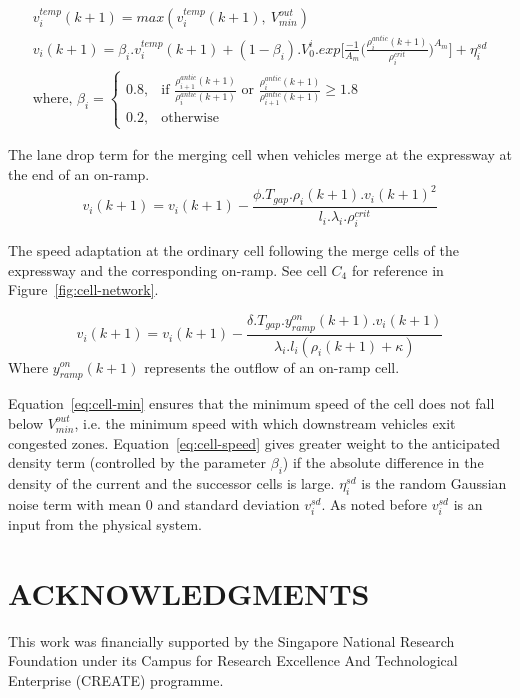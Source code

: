 \documentclass[12pt]{article}
\begin{document}
\begin{subequations}

\begin{eqnarray}
\label{eq:cell-min}
v_i^{temp}(k+1)=max(v_i^{temp}(k+1),~V^{out}_{min})\\
\label{eq:cell-speed}
v_i(k+1)=\beta_i.v_i^{temp}(k+1)+(1-\beta_i).V_0^i.exp\bigg[\frac{-1}{A_m}\bigg( \frac{\rho_i^{antic}(k+1)}{\rho_i^{crit}}\bigg)^{A_m} \bigg]+\eta_i^{sd}\\
\text{where, }\beta_i=
\begin{cases}
0.8, & \text{if } \frac{\rho_{i+1}^{antic}(k+1)}{\rho_i^{antic}(k+1)} \text{ or } \frac{\rho_{i}^{antic}(k+1)}{\rho_{i+1}^{antic}(k+1)} \ge 1.8\\
0.2, & \text{otherwise}
\end{cases}
\end{eqnarray}
\end{subequations}

The lane drop term for the merging cell when vehicles merge at the expressway at the end of an on-ramp.
\begin{equation}
\label{eq:lane-drop-term}
v_i(k+1)=v_i(k+1)-\frac{\phi.T_{gap}.\rho_i(k+1).v_i(k+1)^2}{l_i.\lambda_i.\rho_i^{crit}}
\end{equation} 

The speed adaptation at the ordinary cell following the merge cells of the expressway and the corresponding on-ramp. See cell $C_4$ for reference in Figure~\ref{fig:cell-network}.

\begin{equation}
\label{eq:ramp-merge-term}
v_i(k+1)=v_i(k+1)-\frac{\delta.T_{gap}.y^{on}_{ramp}(k+1).v_i(k+1)}{\lambda_i.l_i(\rho_i(k+1)+\kappa)}
\end{equation}
Where $y^{on}_{ramp}(k+1)$ represents the outflow of an on-ramp cell.

 
Equation~\ref{eq:cell-min} ensures that the minimum speed of the cell does not fall below $V^{out}_{min}$, i.e. the minimum speed with which downstream vehicles exit congested zones. Equation~\ref{eq:cell-speed} gives greater weight to the anticipated density term (controlled by the parameter $\beta_i$) if the absolute difference in the density of the current and the successor cells is large. $\eta_i^{sd}$ is the random Gaussian noise term with mean $0$ and standard deviation $v_i^{sd}$. As noted before $v_i^{sd}$ is an input from the physical system.


\section*{ACKNOWLEDGMENTS}
This work was financially supported by the Singapore National Research Foundation under its Campus for Research Excellence And Technological Enterprise (CREATE) programme.





\end{document}
